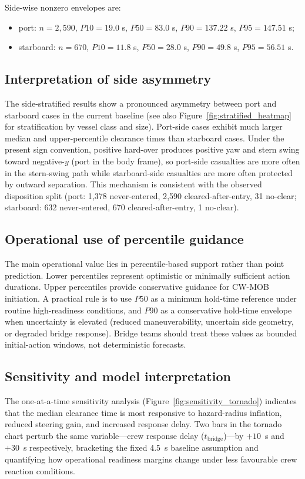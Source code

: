 \documentclass[preprint,12pt]{elsarticle}
\begin{document}
Side-wise nonzero envelopes are:
\begin{itemize}
    \item port: $n=2{,}590$, $P10=19.0$ s, $P50=83.0$ s, $P90=137.22$ s, $P95=147.51$ s;
    \item starboard: $n=670$, $P10=11.8$ s, $P50=28.0$ s, $P90=49.8$ s, $P95=56.51$ s.
\end{itemize}

\subsection{Interpretation of side asymmetry}
The side-stratified results show a pronounced asymmetry between port and starboard cases in the current baseline (see also Figure~\ref{fig:stratified_heatmap} for stratification by vessel class and size). Port-side cases exhibit much larger median and upper-percentile clearance times than starboard cases. Under the present sign convention, positive hard-over produces positive yaw and stern swing toward negative-$y$ (port in the body frame), so port-side casualties are more often in the stern-swing path while starboard-side casualties are more often protected by outward separation. This mechanism is consistent with the observed disposition split (port: 1{,}378 never-entered, 2{,}590 cleared-after-entry, 31 no-clear; starboard: 632 never-entered, 670 cleared-after-entry, 1 no-clear).

\subsection{Operational use of percentile guidance}
The main operational value lies in percentile-based support rather than point prediction. Lower percentiles represent optimistic or minimally sufficient action durations. Upper percentiles provide conservative guidance for CW-MOB initiation. A practical rule is to use $P50$ as a minimum hold-time reference under routine high-readiness conditions, and $P90$ as a conservative hold-time envelope when uncertainty is elevated (reduced maneuverability, uncertain side geometry, or degraded bridge response). Bridge teams should treat these values as bounded initial-action windows, not deterministic forecasts.

\subsection{Sensitivity and model interpretation}
The one-at-a-time sensitivity analysis (Figure~\ref{fig:sensitivity_tornado}) indicates that the median clearance time is most responsive to hazard-radius inflation, reduced steering gain, and increased response delay. Two bars in the tornado chart perturb the same variable---crew response delay ($t_{\mathrm{bridge}}$)---by $+10$~s and $+30$~s respectively, bracketing the fixed 4.5~s baseline assumption and quantifying how operational readiness margins change under less favourable crew reaction conditions.
\end{document}
